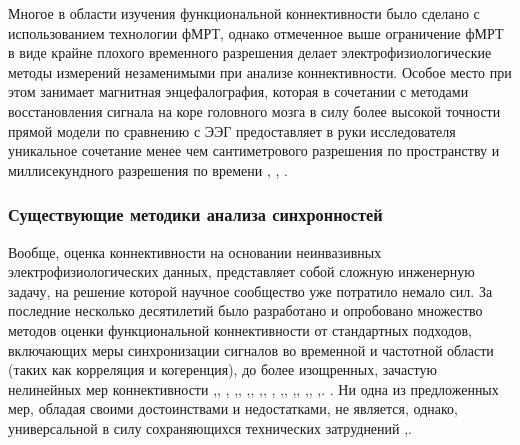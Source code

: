 Многое в области изучения функциональной коннективности было сделано с использованием технологии фМРТ,
однако отмеченное выше ограничение фМРТ в виде крайне плохого временного разрешения делает электрофизиологические
методы измерений незаменимыми при анализе коннективности. Особое место при этом занимает магнитная энцефалография,
которая в сочетании с методами восстановления сигнала на коре головного мозга
в силу более высокой точности прямой модели по сравнению с ЭЭГ предоставляет
в руки исследователя уникальное сочетание менее чем сантиметрового разрешения по пространству
и миллисекундного разрешения по времени ,
, .


\subsubsection*{Существующие методики анализа синхронностей}

Вообще, оценка коннективности на основании неинвазивных электрофизиологических данных,
 представляет собой сложную инженерную задачу,
на решение которой научное сообщество уже потратило немало сил.
За последние несколько десятилетий было разработано и опробовано множество методов
оценки функциональной коннективности от стандартных подходов,
включающих меры синхронизации сигналов во временной и
частотной области (таких как корреляция и когеренция), до более изощренных,
зачастую нелинейных мер коннективности
,,
,
,,
,,
,,
,
,,
,,
,,
,.
.
Ни одна из предложенных мер, обладая своими достоинствами и недостатками, не является, однако, универсальной в силу
сохраняющихся технических затруднений ,.

